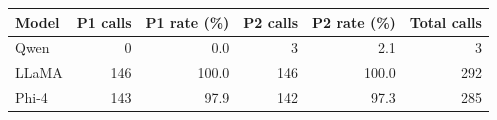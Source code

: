 \begin{tabular}{@{}lrrrrr@{}}
\toprule
Model & P1 calls & P1 rate (\%) & P2 calls & P2 rate (\%) & Total calls \\
\midrule
Qwen & 0 & 0.0 & 3 & 2.1 & 3 \\
LLaMA & 146 & 100.0 & 146 & 100.0 & 292 \\
Phi-4 & 143 & 97.9 & 142 & 97.3 & 285 \\
\bottomrule
\end{tabular}